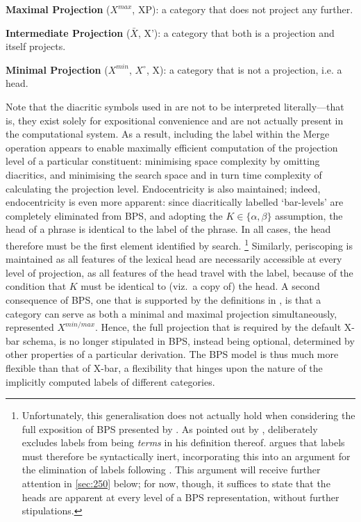 \begin{samepage}%
\begin{subexamples}[preamble={\textbf{Levels of Projection} \parencite{ChomskyN_1995, MuyskenP_1982}}]\label{ex:minmaxproj}
    \item \textbf{Maximal Projection} ($X^{max}$, XP): a category that does not project any further.
    \item \textbf{Intermediate Projection} ($\bar{X}$, X'): a category that both is a projection and itself projects.
    \item \textbf{Minimal Projection} ($X^{min}$, $X^{\circ}$, X): a category that is not a projection, i.e. a head.
\end{subexamples}
\end{samepage}
\noindent
Note that the diacritic symbols used in  are not to be interpreted literally---that is, they exist solely for expositional convenience and are not actually present in the computational system. As a result, including the label within the Merge operation appears to enable maximally efficient computation of the projection level of a particular constituent: minimising space complexity by omitting diacritics, and minimising the search space and in turn time complexity of calculating the projection level. Endocentricity is also maintained; indeed, endocentricity is even more apparent: since diacritically labelled `bar-levels' are completely eliminated from BPS, and adopting the $K\in\{\alpha,\beta\}$ assumption, the head of a phrase is identical to the label of the phrase. In all cases, the head therefore must be the first element identified by search.%
\footnote{\label{fn:seely}Unfortunately, this generalisation does not actually hold when considering the full exposition of BPS presented by \textcite{ChomskyN_1994}. As pointed out by \textcite{SeelyTD_2006}, \textcite{ChomskyN_1994} deliberately excludes labels from being \textit{terms} in his definition thereof. \textcite{SeelyTD_2006} argues that labels must therefore be syntactically inert, incorporating this into an argument for the elimination of labels following \textcite{CollinsC_2002}. This argument will receive further attention in \autoref{sec:250} below; for now, though, it suffices to state that the heads are apparent at every level of a BPS representation, without further stipulations.}
Similarly, periscoping is maintained as all features of the lexical head are necessarily accessible at every level of projection, as all features of the head travel with the label, because of the condition that $K$ must be identical to (viz.~a copy of) the head. A second consequence of BPS, one that is supported by the definitions in , is that a category can serve as both a minimal and maximal projection simultaneously, represented $X^{min/max}$. Hence, the full projection that is required by the default X-bar schema, is no longer stipulated in BPS, instead being optional, determined by other properties of a particular derivation. The BPS model is thus much more flexible than that of X-bar, a flexibility that hinges upon the nature of the implicitly computed labels of different categories.

